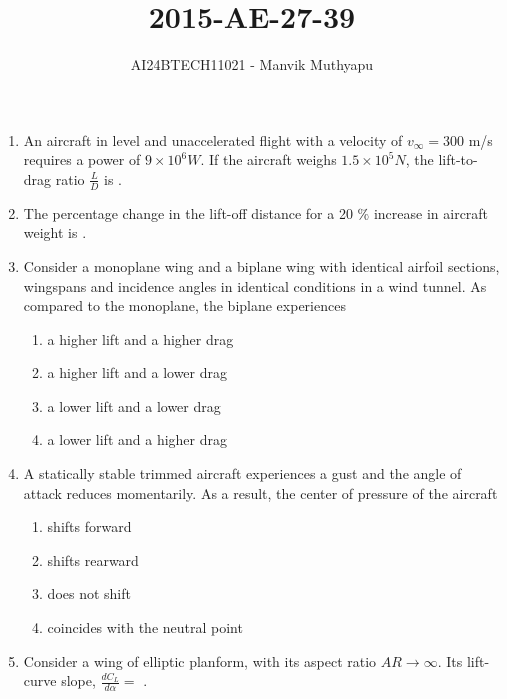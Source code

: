 \documentclass[journal,12pt,onecolumn]{IEEEtran}
\title{2015-AE-27-39}
\author{AI24BTECH11021 - Manvik Muthyapu}
\theoremstyle{remark}
\begin{document}

\maketitle
\bigskip

\renewcommand{\thefigure}{\theenumi}
\renewcommand{\thetable}{\theenumi}

\begin{enumerate}

\item An aircraft in level and unaccelerated flight with a velocity of $v_\infty = 300$ m/s requires a power of $9 \times 10^6 W$. If the aircraft weighs $1.5 \times 10^5 N$, the lift-to-drag ratio $\frac{L}{D}$ is \underline{\hspace{2cm}}. 

\item The percentage change in the lift-off distance for a 20 $\%$ increase in aircraft weight is \underline{\hspace{2cm}}.

\item Consider a monoplane wing and a biplane wing with identical airfoil sections, wingspans and incidence angles in identical conditions in a wind tunnel. As compared to the monoplane, the biplane experiences 

\begin{enumerate}
	\item a higher lift and a higher drag
	\item a higher lift and a lower drag
	\item a lower lift and a lower drag
	\item a lower lift and a higher drag
\end{enumerate}

\item A statically stable trimmed aircraft experiences a gust and the angle of attack reduces momentarily. As a result, the center of pressure of the aircraft

\begin{enumerate}
	\item shifts forward
	\item shifts rearward
	\item does not shift
	\item coincides with the neutral point
\end{enumerate}

\item Consider a wing of elliptic planform, with its aspect ratio $AR \rightarrow \infty$. Its lift-curve slope, $\frac{dC_{L}}{d\alpha}=$ \underline{\hspace{2cm}}.


\end{enumerate}
\end{document}
